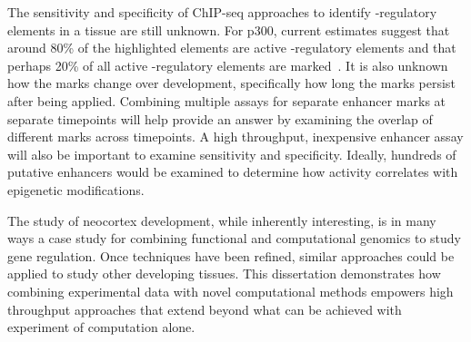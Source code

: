 The sensitivity and specificity of ChIP-seq approaches to identify \cis-regulatory elements in a tissue are still
unknown.  For p300, current estimates suggest that around 80\% of the highlighted elements are active \cis-regulatory elements
and that perhaps 20\% of all active \cis-regulatory elements are marked~\citep{Visel2009a}.  It is also unknown how the marks change
over development, specifically how long the marks persist after being applied.
Combining multiple assays for separate enhancer marks at separate timepoints will help provide an answer by
examining the overlap of different marks across timepoints.  A high throughput, inexpensive enhancer assay
will also be important to examine sensitivity and specificity.  Ideally, hundreds of putative enhancers would be
examined to determine how activity correlates with epigenetic modifications.

The study of neocortex development, while inherently interesting, is in many ways a case study for combining
functional and computational genomics to study gene regulation.  Once techniques have been refined, similar
approaches could be applied to study other developing tissues.  This dissertation demonstrates how combining
experimental data with novel computational methods empowers high throughput approaches that extend beyond
what can be achieved with experiment of computation alone.
